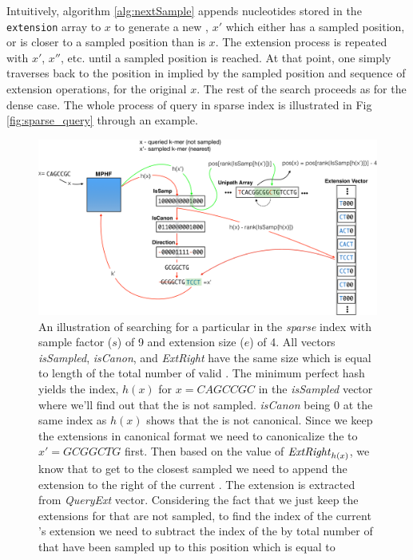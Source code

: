 Intuitively, algorithm \ref{alg:nextSample} appends nucleotides stored in the
\texttt{extension} array to $x$ to generate a new \kmer, $x'$ which either has a
sampled position, or is closer to a sampled position than is $x$. The extension
process is repeated with $x'$, $x''$, etc. until a sampled position is reached.
At that point, one simply traverses back to the position in \cseq implied by the
sampled position and sequence of extension operations, for the original \kmer
$x$. The rest of the search proceeds as for the dense case. The whole process of
\kmer query in sparse index is illustrated in Fig \ref{fig:sparse_query} through an example.

\begin{figure}
  \includegraphics[width=\textwidth]{figs/query_sparse}
\caption{An illustration of searching for a particular \kmer in the \emph{sparse}
  \pufferfish index with sample factor ($s$) of 9 and extension size ($e$) of 4.
  All vectors \emph{isSampled}, \emph{isCanon}, and \emph{ExtRight} have the same
  size which is equal to length of the total number of valid \kmers.
  The minimum perfect hash yields the index, $h(x)$ for $x=CAGCCGC$ in the
  \emph{isSampled} vector where we'll find out that the \kmer is not sampled.
  \emph{isCanon} being $0$ at the same index as $h(x)$ shows that the \kmer
  is not canonical. Since we keep the extensions in canonical format we need to 
  canonicalize the \kmer to $x'=GCGGCTG$ first. Then based on the value of 
  $\text{\emph{ExtRight}}_{h(x)}$, we know that to get to the closest sampled \kmer
  we need to append the extension to the right of the current \kmer.
  The extension is extracted from \emph{QueryExt} vector. Considering the fact
  that we just keep the extensions for \kmers that are not sampled,
  to find the index of the current \kmer's extension we need to
  subtract the index of the \kmer by total number
  of \kmers that have been sampled up to this position which is equal to 
}
\end{figure}
